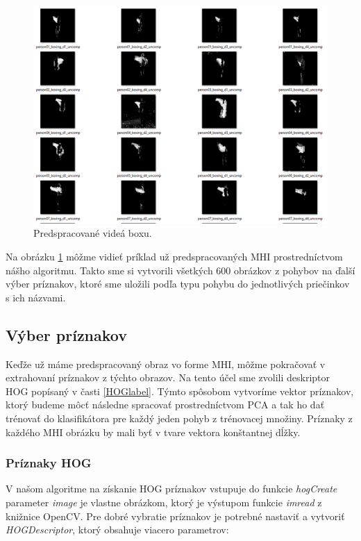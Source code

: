 \begin{figure}[H]
  \centering
  \includegraphics[width=16cm]{img/MHIbox.png}
  \caption{Predspracované videá boxu.}
  \label{MHIbox}
\end{figure}  

Na obrázku \ref{MHIbox} môžme vidieť príklad už predspracovaných MHI prostredníctvom nášho algoritmu. Takto sme si vytvorili všetkých 600 obrázkov z pohybov na ďalší výber príznakov, ktoré sme uložili podľa typu pohybu do jednotlivých priečinkov s ich názvami. 

\subsection{Výber príznakov}
Keďže už máme predspracovaný obraz vo forme MHI, môžme pokračovať v extrahovaní príznakov z týchto obrazov. Na tento účel sme zvolili deskriptor HOG popísaný v časti \ref{HOGlabel}. Týmto spôsobom vytvoríme vektor príznakov, ktorý budeme môcť následne spracovať prostredníctvom PCA a tak ho dať trénovať do klasifikátora pre každý jeden pohyb z trénovacej množiny. Príznaky z každého MHI obrázku by mali byť v tvare vektora konštantnej dĺžky. 

\subsubsection{Príznaky HOG} \label{HOGim}

V našom algoritme na získanie HOG príznakov vstupuje do funkcie \textit{hogCreate} parameter \textit{image} je vlastne obrázkom, ktorý je výstupom funkcie   \textit{imread} z knižnice OpenCV. Pre dobré vybratie príznakov je potrebné nastaviť a vytvoriť \textit{HOGDescriptor}, ktorý obsahuje viacero parametrov:

